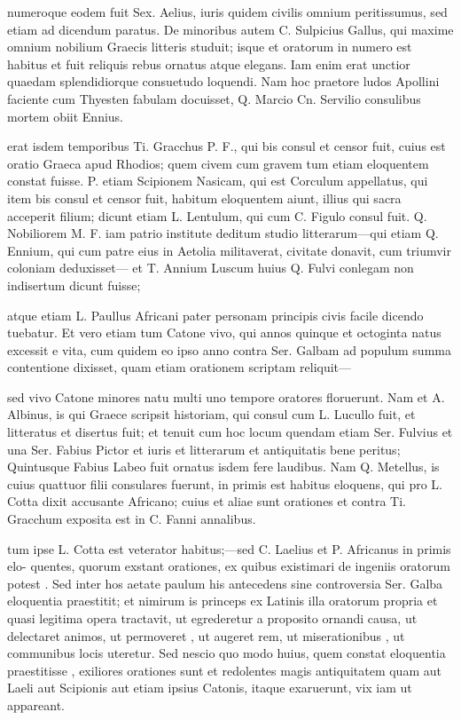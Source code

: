  numeroque eodem fuit Sex. Aelius, iuris quidem civilis omnium peritissumus, sed etiam ad dicendum paratus. De minoribus autem C. Sulpicius Gallus, qui maxime omnium nobilium Graecis litteris studuit; isque et oratorum in numero est habitus et fuit reliquis rebus ornatus atque elegans. Iam enim erat unctior quaedam splendidiorque consuetudo loquendi. Nam hoc praetore ludos Apollini faciente cum Thyesten fabulam docuisset, Q. Marcio Cn. Servilio consulibus mortem obiit Ennius.

 erat isdem temporibus Ti. Gracchus P. F., qui bis consul et censor fuit, cuius est oratio Graeca apud Rhodios; quem civem cum gravem tum etiam eloquentem constat fuisse. P. etiam Scipionem Nasicam, qui est Corculum appellatus, qui item bis consul et censor fuit, habitum eloquentem aiunt, illius qui sacra acceperit filium; dicunt etiam L. Lentulum, qui cum C. Figulo consul fuit. Q. Nobiliorem M. F. iam patrio institute deditum studio litterarum—qui etiam Q. Ennium, qui cum patre eius in Aetolia militaverat, civitate donavit, cum triumvir coloniam deduxisset— et T. Annium Luscum huius Q. Fulvi conlegam non indisertum dicunt fuisse;

 atque etiam L. Paullus Africani pater personam principis civis facile dicendo tuebatur. Et vero etiam tum Catone vivo, qui annos quinque et octoginta natus excessit e vita, cum quidem eo ipso anno contra Ser. Galbam ad populum summa contentione dixisset, quam etiam orationem scriptam reliquit—

 sed vivo Catone minores natu multi uno tempore oratores floruerunt. Nam et A. Albinus, is qui Graece scripsit historiam, qui consul cum L. Lucullo fuit, et litteratus et disertus fuit; et tenuit cum hoc locum quendam etiam Ser. Fulvius et una Ser. Fabius Pictor et iuris et litterarum et antiquitatis bene peritus; Quintusque Fabius Labeo fuit ornatus isdem fere laudibus. Nam Q. Metellus, is cuius quattuor filii consulares fuerunt, in primis est habitus eloquens, qui pro L. Cotta dixit accusante Africano; cuius et aliae sunt orationes et contra Ti. Gracchum exposita est in C. Fanni annalibus.

 tum ipse L. Cotta est veterator habitus;—sed C. Laelius et P. Africanus in primis elo- quentes, quorum exstant orationes, ex quibus existimari de ingeniis oratorum potest . Sed inter hos aetate paulum his antecedens sine controversia Ser. Galba eloquentia praestitit; et nimirum is princeps ex Latinis illa oratorum propria et quasi legitima opera tractavit, ut egrederetur a proposito ornandi causa, ut delectaret animos, ut permoveret , ut augeret rem, ut miserationibus , ut communibus locis uteretur. Sed nescio quo modo huius, quem constat eloquentia praestitisse , exiliores orationes sunt et redolentes magis antiquitatem quam aut Laeli aut Scipionis aut etiam ipsius Catonis, itaque exaruerunt, vix iam ut appareant.

